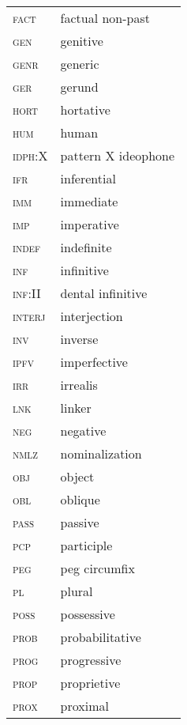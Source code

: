 \begin{multicols}{2}
\begin{tabular}{lp{4.5cm}}
	\textsc{fact} 	&	factual non-past	\\
\textsc{gen} 	&	genitive	\\
\textsc{genr} 	&	generic	\\
\textsc{ger} 	&	gerund	\\
\textsc{hort } 	&	hortative	\\
\textsc{hum} 	&	human	\\
\textsc{idph:X} 	&	pattern X ideophone 	\\
\textsc{ifr} 	&	inferential	\\
\textsc{imm} 	&	immediate	\\
\textsc{imp} 	&	imperative	\\
\textsc{indef} 	&	indefinite	\\
\textsc{inf} 	&	infinitive	\\
\textsc{inf:II} 	&	dental infinitive	\\
\textsc{interj} 	&	interjection	\\
\textsc{inv} 	&	inverse	\\
\textsc{ipfv} 	&	imperfective	\\
\textsc{irr} 	&	irrealis	\\
\textsc{lnk} 	&	linker	\\
\textsc{neg} 	&	negative	\\
\textsc{nmlz} 	&	nominalization	\\
\textsc{obj} 	&	object	\\
\textsc{obl} 	&	oblique	\\
\textsc{pass} 	&	passive	\\
\textsc{pcp} 	&	participle	\\
\textsc{peg} 	&	peg circumfix	\\
\textsc{pl} 	&	plural	\\
\textsc{poss} 	&	possessive	\\
\textsc{prob} 	&	probabilitative	\\
\textsc{prog} 	&	progressive	\\
\textsc{prop} 	&	proprietive	\\
\textsc{prox} 	&	proximal	\\
\end{tabular}


\end{multicols}
